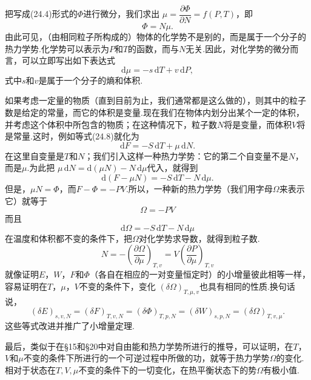 把写成(24.4)形式的$\varPhi$进行微分，我们求出
$\mu=\dfrac{\partial\varPhi}{\partial N}=f(P,T)$，即
\begin{equation}
  \varPhi=N\mu.
\end{equation}
由此可见，（由相同粒子所构成的）物体的化学势不是别的，而是属于一个分子的热力学势.化学势可以表示为$P$和$T$的函数，而与$N$无关.因此，对化学势的微分而言，可以立即写出如下表达式
\begin{equation}
  \mathrm{d}\mu=-s\,\mathrm{d}T+v\,\mathrm{d}P,
\end{equation}
式中$s$和$v$是属于一个分子的熵和体积.

如果考虑一定量的物质（直到目前为止，我们通常都是这么做的），则其中的粒子数是给定的常量，而它的体积是变量.现在我们在物体内划分出某个一定的体积，并考虑这个体积中所包含的物质；在这种情况下，粒子数$N$将是变量，而体积$V$将是常量.这时，例如等式(24.8)就化为
\begin{equation*}
  \mathrm{d}F=-S\,\mathrm{d}T+\mu\,\mathrm{d}N.
\end{equation*}
在这里自变量是$T$和$N$；我们引入这样一种热力学势：它的第二个自变量不是$N$，而是$\mu$.为此把
$\mu\,\mathrm{d}N=\mathrm{d}(\mu N)-N\,\mathrm{d}\mu$代入，就得到
\begin{equation*}
  \mathrm{d}(F-\mu N)=-S\,\mathrm{d}T-N\,\mathrm{d}\mu.
\end{equation*}
但是，$\mu N=\varPhi$，而$F-\varPhi=-PV$.所以，一种新的热力学势（我们用字母$\Omega$来表示它）就等于
\begin{equation}
  \Omega=-PV
\end{equation}
而且
\begin{equation}
  \mathrm{d}\Omega=-S\,\mathrm{d}T-N\,\mathrm{d}\mu
\end{equation}
在温度和体积都不变的条件下，把$\Omega$对化学势求导数，就得到粒子数.
\begin{equation}
  N=-\left(\frac{\partial\Omega}{\partial\mu}\right)_{T,v}
  =V\left(\frac{\partial P}{\partial\mu}\right)_{T,v}
\end{equation}
就像证明$E$，$W$，$F$和$\varPhi$（各自在相应的一对变量恒定时）的小增量彼此相等一样，容易证明在$T$，$\mu$，$V$不变的条件下，变化
$(\delta\Omega)_{T,\mu,v}$也具有相同的性质.换句话说，
\begin{equation}
  (\delta E)_{s,v,N}=(\delta F)_{T,v,N}
  =(\delta\varPhi)_{T,p,N}=(\delta W)_{s,p,N}
  =(\delta\Omega)_{T,v,\mu}.
\end{equation}
这些等式改进并推广了小增量定理.

最后，类似于在§15和§20中对自由能和热力学势所进行的推导，可以证明，在$T$，$V$和$\mu$不变的条件下所进行的一个可逆过程中所做的功，就等于热力学势$\Omega$的变化.相对于状态在$T,V,\mu$不变的条件下的一切变化，在热平衡状态下的势$\Omega$有极小值.

